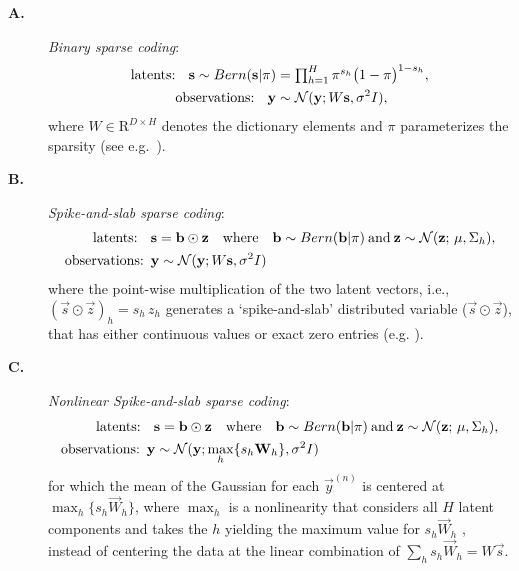 \begin{description}
\item[\textbf{A.}] \textit{Binary sparse coding}:
%
\vspace{-.1cm}
\begin{align}
\text{latents: } \,\,\,\vec{s} \sim Bern(\vec{s} | \pi) &= \disT\prod_{h=1}^H \pi^{s_h} \big( 1 - \pi \big)^{1-s_h},\nonumber \\
\text{observations:  }\,\,\,    \vec{y} &\sim \mathcal{N}(\vec{y}; W\vec{s}, \sigma^2\One),\nonumber%
\end{align}
%
where $W \in \mathrm{R}^{D \times H}$ denotes the dictionary elements and $\pi$ parameterizes the sparsity (see e.g.~\citep{HennigesEtAl2010}).
\item[\textbf{B.}] \textit{Spike-and-slab sparse coding}:
\vspace{-.2cm}
\begin{align}
\text{latents: } & \,\,\,\vec{s} = \vec{b}\odot\vec{z}
\quad\mathrm{where}\quad \vec{b}\sim Bern(\vec{b} | \pi)
\:\mathrm{and} \:
\vec{z} \sim \mathcal{N}(\vec{z};\,\vec{\mu} , \Sigma_h),\nonumber\\
\text{observations:} & \,\,\, \vec{y} \sim \mathcal{N}(\vec{y}; W\vec{s}, \sigma^2\One)\nonumber%
\end{align}
where the point-wise multiplication of the two latent vectors, i.e., $(\vec{s}\odot\vec{z})_h = s_h\,z_h$
generates a `spike-and-slab' distributed variable ($\vec{s}\odot\vec{z}$), that has either continuous values or exact zero entries (e.g. \citep{TitsiasGredilla2011,GoodfellowEtAl2013,SheikhEtAl2014}).
%
\item[\textbf{C.}] \textit{Nonlinear Spike-and-slab sparse coding}:
\vspace{-.2cm}
\begin{align}\label{eq:ssmca}
\text{latents: } & \,\,\,{\mathbf{s}} = {\mathbf{b}}\odot{\mathbf{z}}
\quad\mathrm{where}\quad {\mathbf{b}}\sim Bern({\mathbf{b}} | \pi)
\:\mathrm{and} \:
{\mathbf{z}} \sim \mathcal{N}({\mathbf{z}};\,{\mathbf{\mu}} , \Sigma_h),\nonumber\\
 \text{observations:}\,\,\, &{\mathbf{y}} \sim \mathcal{N}({\mathbf{y}}; \max_{h}\{s_h{\mathbf{W}}_{h}\}, \sigma^2I)\nonumber
\end{align}
for which the mean of the Gaussian for each $\vec{y}^{(n)}$ is centered at $\max_{h}\{s_h\vec{W}_{h}\}$, where $\max_{h}$ is a nonlinearity that considers all $H$ latent components and takes the $h$ yielding the maximum value for $s_h\vec{W}_{h}$ \citep{LuckeSahani2008,SheltonEtAl2012,BornscheinEtAl2013,SheltonEtAl2015}, instead of centering the data at the linear combination of $\sum_h s_h\vec{W}_h=W\vec{s}$.
%
\end{description}

